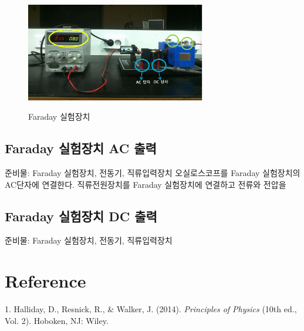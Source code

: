 \documentclass[a4paper]{article}
\begin{document}
	\begin{figure}[h]
		\centering
		\includegraphics[width=0.7\textwidth]{img/exp1.PNG}
		\label{fig:exp1}
		\caption{Faraday 실험장치}
	\end{figure}
	
	\subsection{Faraday 실험장치 AC 출력}
	준비물: Faraday 실험장치, 전동기, 직류입력장치
	오실로스코프를 Faraday 실험장치의 AC단자에 연결한다. 직류전원장치를 Faraday 실험장치에 연결하고 전류와 전압을 
	\subsection{Faraday 실험장치 DC 출력}
	준비물: Faraday 실험장치, 전동기, 직류입력장치






\section{Reference}
	1. Halliday, D., Resnick, R., \& Walker, J. (2014). {\it{}Principles of Physics} (10th ed., Vol. 2). Hoboken, NJ: Wiley. 
\end{document}
